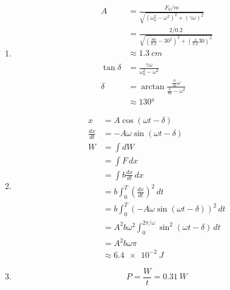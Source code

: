 \documentclass{article}
\begin{document}
\begin{enumerate}
  \item

        \begin{align*}
          A           & = \frac{F_0 / m}{\sqrt{(\omega_0^2 - \omega^2)^2 + (\gamma \omega)^2}}                              \\
                      & = \frac{2 / 0.2}{\sqrt{\left( \frac{80}{0.2} - 30^2 \right)^2 + \left( \frac{4}{0.2} 30 \right)^2}} \\
                      & \approx \qty{1.3}{cm}                                                                               \\ \\
          \tan \delta & = \frac{\gamma \omega}{\omega_0^2 - \omega^2}                                                       \\
          \delta      & = \arctan \frac{\frac{b}{m} \omega}{\frac{k}{m} - \omega^2}                                         \\
                      & \approx \ang{130}
        \end{align*}

  \item

        \begin{align*}
          x               & = A \cos (\omega t - \delta)                                             \\
          \frac{d x}{d t} & = -A \omega \sin (\omega t - \delta)                                     \\
          W               & = \int dW                                                                \\
                          & = \int F \,dx                                                            \\
                          & = \int b \frac{d x}{d t} \,dx                                            \\
                          & = b \int_0^T \left( \frac{d x}{d t} \right)^2 \,dt                       \\
                          & = b \int_0^T (-A \omega \sin (\omega t - \delta))^2 \,dt                 \\
                          & = A^2 b \omega^2 \int_0^{2 \pi / \omega} \sin^2 (\omega t - \delta) \,dt \\
                          & = A^2 b \omega \pi                                                       \\
                          & \approx \qty{6.4e-2}{J}
        \end{align*}

  \item \[P = \frac{W}{t} = \qty{0.31}{W}\]
\end{enumerate}
\end{document}
